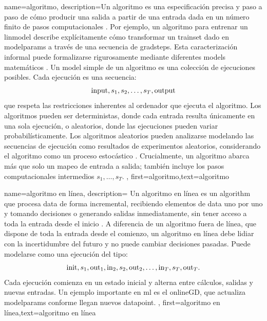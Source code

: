 {name={algoritmo},
  description={Un algoritmo es una especificación precisa y paso a paso de
    cómo producir una salida a partir de una entrada dada en un número finito de pasos computacionales \cite{Cormen:2022aa}. 
    Por ejemplo, un algoritmo para entrenar un \gls{linmodel} describe explícitamente cómo
	transformar un \gls{trainset} dado en \gls{modelparams} a través de una secuencia de \gls{gradstep}s. 
    Esta caracterización informal puede formalizarse rigurosamente mediante diferentes \gls{model}s matemáticos \cite{Sipser2013}. 
   	Un \gls{model} simple de un algoritmo es una colección de ejecuciones posibles. Cada ejecución es una secuencia:
    $${\rm input},s_1,s_2,\ldots,s_T,{\rm output}$$ 
    que respeta las restricciones inherentes al ordenador que ejecuta el algoritmo.
	Los algoritmos pueden ser deterministas, donde cada entrada resulta únicamente en una sola ejecución,
	o aleatorios, donde las ejecuciones pueden variar probabilísticamente. Los algoritmos aleatorios 
	pueden analizarse modelando las secuencias de ejecución como resultados de experimentos aleatorios, 
	considerando el algoritmo como un proceso estocástico \cite{RandomizedAlgos,BertsekasProb,Gallager13}.
	Crucialmente, un algoritmo abarca más que solo un mapeo de entrada a salida; también incluye 
	los pasos computacionales intermedios $s_1,\ldots,s_T$. 
	},
	first={algoritmo},text={algoritmo} 
}

{name=algoritmo en línea,
	description={
		Un algoritmo en línea es un \gls{algorithm} que procesa \gls{data} de forma incremental,
		recibiendo elementos de \gls{data} uno por uno y tomando decisiones o generando salidas inmediatamente, sin tener acceso a toda la entrada desde el inicio \cite{HazanOCO,PredictionLearningGames}.
		A diferencia de un algoritmo fuera de línea, que dispone de toda la entrada desde el comienzo, un algoritmo en línea debe lidiar con la incertidumbre del futuro y no puede cambiar decisiones pasadas.
		Puede modelarse como una ejecución del tipo:
		$${\rm init},s_1,{\rm out}_{1},{\rm in}_{2},s_2,{\rm out}_{2},\ldots,{\rm in}_{T},s_T,{\rm out}_{T}.$$
		Cada ejecución comienza en un estado inicial y alterna entre cálculos, salidas y nuevas entradas.
		Un ejemplo importante en \gls{ml} es el \gls{onlineGD}, que actualiza \gls{modelparams} conforme llegan nuevos \gls{datapoint}.
	},
	first={algoritmo en línea},text={algoritmo en línea}
}



